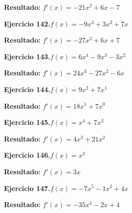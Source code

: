 \documentclass[10pt,a4paper]{article}
\begin{document}
\begin{solbox}
\textbf{Resultado:} \(\displaystyle f'(x) = -21x^2 +6x -7\)
\end{solbox}

\newpage
\begin{ejbox}
\textbf{Ejercicio 142.}\quad $f(x) = -9x^3 +3x^2 +7x$
\end{ejbox}

\begin{solbox}
\textbf{Resultado:} \(\displaystyle f'(x) = -27x^2 +6x +7\)
\end{solbox}

\begin{ejbox}
\textbf{Ejercicio 143.}\quad $f(x) = 6x^4 -9x^3 -3x^2$
\end{ejbox}

\begin{solbox}
\textbf{Resultado:} \(\displaystyle f'(x) = 24x^3 -27x^2 -6x\)
\end{solbox}

\begin{ejbox}
\textbf{Ejercicio 144.}\quad $f(x) = 9x^{2} + 7x^{1}$
\end{ejbox}

\begin{solbox}
\textbf{Resultado:} \(\displaystyle f'(x) = 18x^{1} + 7x^{0}\)
\end{solbox}

\newpage
\begin{ejbox}
\textbf{Ejercicio 145.}\quad $f(x) = x^{4} + 7x^{3}$
\end{ejbox}

\begin{solbox}
\textbf{Resultado:} \(\displaystyle f'(x) = 4x^{3} + 21x^{2}\)
\end{solbox}

\begin{ejbox}
\textbf{Ejercicio 146.}\quad $f(x) = x^{2}$
\end{ejbox}

\begin{solbox}
\textbf{Resultado:} \(\displaystyle f'(x) = 3x\)
\end{solbox}

\begin{ejbox}
\textbf{Ejercicio 147.}\quad $f(x) = -7x^{5} -1x^2 +4x$
\end{ejbox}

\begin{solbox}
\textbf{Resultado:} \(\displaystyle f'(x) = -35x^{4} -2x +4\)
\end{solbox}
\end{document}
